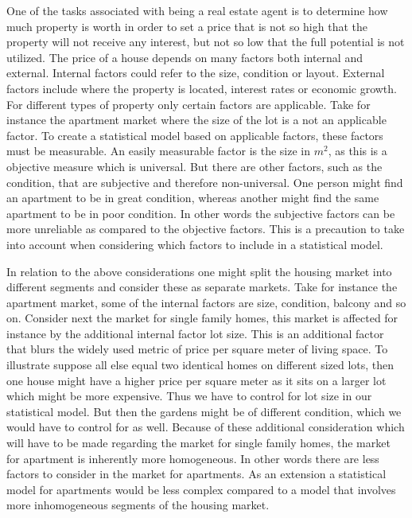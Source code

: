 \label{ch:introduction}

One of the tasks associated with being a real estate agent is to determine how much property is worth in order to set a price that is not so high that the property will not receive any interest, but not so low that the full potential is not utilized.
The price of a house depends on many factors both internal and external.
Internal factors could refer to the size, condition or layout.
External factors include where the property is located, interest rates or economic growth.
For different types of property only certain factors are applicable.
Take for instance the apartment market where the size of the lot is a not an applicable factor.
To create a statistical model based on applicable factors, these factors must be measurable.
An easily measurable factor is the size in $m^2$, as this is a objective measure which is universal.
But there are other factors, such as the condition, that are subjective and therefore non-universal.
One person might find an apartment to be in great condition, whereas another might find the same apartment to be in poor condition.
In other words the subjective factors can be more unreliable as compared to the objective factors. 
This is a precaution to take into account when considering which factors to include in a statistical model.

In relation to the above considerations one might split the housing market into different segments and consider these as separate markets.
Take for instance the apartment market, some of the internal factors are size, condition, balcony and so on.
Consider next the market for single family homes, this market is affected for instance by the additional internal factor lot size.
This is an additional factor that blurs the widely used metric of price per square meter of living space.
To illustrate suppose all else equal two identical homes on different sized lots, then one house might have a higher price per square meter as it sits on a larger lot which might be more expensive.
Thus we have to control for lot size in our statistical model.
But then the gardens might be of different condition, which we would have to control for as well.
Because of these additional consideration which will have to be made regarding the market for single family homes, the market for apartment is inherently more homogeneous.
In other words there are less factors to consider in the market for apartments.
As an extension a statistical model for apartments would be less complex compared to a model that involves more inhomogeneous segments of the housing market.

